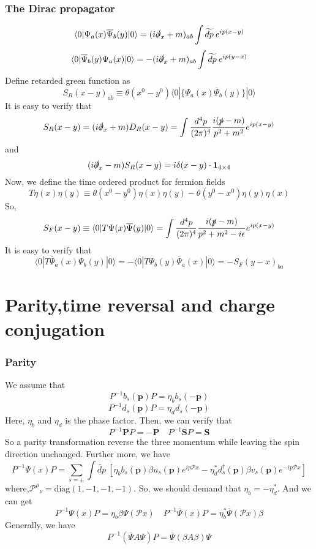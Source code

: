 \subsubsection{The Dirac propagator}
\[\langle 0 | \Psi_a(x)\overline{\Psi}_b(y)|0\rangle = (i\slashed{\partial}_x+m)_{ab} \int \widetilde{dp} \: e^{ip(x-y)}\]
\[\langle 0 | \overline{\Psi}_b(y) \Psi_a(x)|0\rangle = -(i\slashed{\partial}_x+m)_{ab} \int \widetilde{dp} \: e^{ip(y-x)}\]
Define retarded green function as
\[S_{R}(x-y)_{ab} \equiv \theta(x^0-y^0) \langle 0 | \{\Psi_a(x)\overline{\Psi}_b(y)\}|0\rangle\]
It is easy to verify that
\[S_{R}(x-y) = (i\slashed{\partial}_x+m) D_R(x-y) = \int \frac{d^4p}{(2\pi)^4} \frac{i(\slashed{p}-m)}{p^2+m^2} e^{ip(x-y)}\]
and
\[(i\slashed{\partial}_x-m) S_R(x-y) = i\delta(x-y) \cdot \bm{1}_{4\times 4}\]
Now, we  define  the time ordered product for fermion fields
\[T \eta(x) \eta(y) \equiv \theta(x^0-y^0)\eta(x)\eta(y) - \theta(y^0-x^0)\eta(y)\eta(x)\]
So,
\[S_F(x-y) \equiv \langle 0 | T \Psi(x)\overline{\Psi}(y)|0\rangle =  \int \frac{d^4p}{(2\pi)^4} \frac{i(\slashed{p}-m)}{p^2+m^2 - i\epsilon} e^{ip(x-y)}\]
It is easy to verify that
\[\langle 0 | T \overline{\Psi}_a(x) \Psi_b(y)|0\rangle = - \langle 0 | T \Psi_b(y) \overline{\Psi}_a(x)|0\rangle = -S_F(y-x)_{ba}\]

\section{Parity,time reversal and charge conjugation}
\subsubsection{Parity}
\noindent
We assume that
\[P^{-1} b_s(\bm{p})P = \eta_b b_s(\bm{-p})\]
\[P^{-1} d_s(\bm{p})P = \eta_d d_s(\bm{-p})\]
Here, $\eta_b$ and $\eta_d$ is the phase factor. Then, we can verify that
\[P^{-1} \bm{P} P = -\bm{P} \quad P^{-1} \bm{S} P =  \bm{S}\]
So a parity transformation reverse the three momentum while leaving the spin direction unchanged. Further more, we have
\[P^{-1}\Psi(x)P = \sum_{s=\pm} \int \widetilde{dp} \: \left [ \eta_b b_s(\bm{p})\beta u_s(\bm{p})e^{ip\mathcal{P}x} - \eta_d^* d^{\dagger}_s(\bm{p}) \beta v_s(\bm{p})e^{-ip\mathcal{P}x} \right ]\]
where,$\mathcal{P}^{\mu}_{\phantom{\mu}\nu} = \mathrm{diag}(1,-1,-1,-1)$.
So, we should demand that $\eta_b = -\eta^*_d$. And we can get
\[P^{-1}\Psi(x)P = \eta_b \beta \Psi(\mathcal{P}x) \quad P^{-1}\overline{\Psi}(x)P = \eta^*_b  \overline{\Psi}(\mathcal{P}x)\beta \]
Generally, we have
\[P^{-1} (\overline{\Psi} A \Psi) P = \overline{\Psi}(\beta A \beta)\Psi\]

